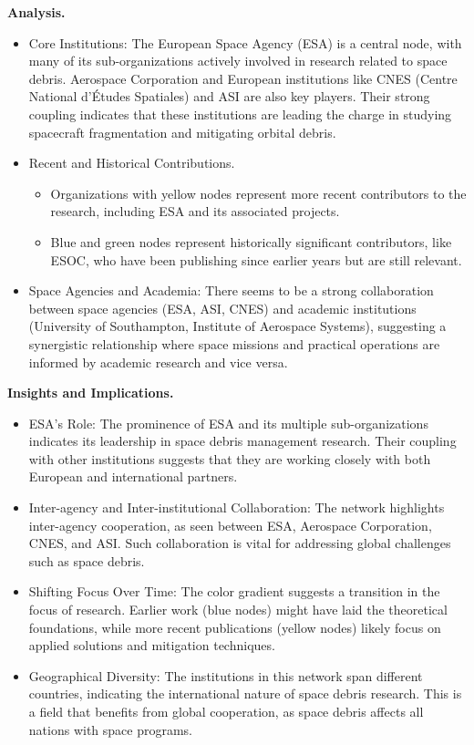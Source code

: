 \documentclass[journal ]{new-aiaa}
\begin{document}
\textbf{Analysis.}
\begin{itemize}
    \item Core Institutions: The European Space Agency (ESA) is a central node, with many of its sub-organizations actively involved in research related to space debris. Aerospace Corporation and European institutions like CNES (Centre National d'Études Spatiales) and ASI are also key players. Their strong coupling indicates that these institutions are leading the charge in studying spacecraft fragmentation and mitigating orbital debris.
    \item Recent and Historical Contributions.
    \begin{itemize}
        \item Organizations with yellow nodes represent more recent contributors to the research, including ESA and its associated projects.
        \item Blue and green nodes represent historically significant contributors, like ESOC, who have been publishing since earlier years but are still relevant.
    \end{itemize}
    \item Space Agencies and Academia: There seems to be a strong collaboration between space agencies (ESA, ASI, CNES) and academic institutions (University of Southampton, Institute of Aerospace Systems), suggesting a synergistic relationship where space missions and practical operations are informed by academic research and vice versa.
\end{itemize}

\textbf{Insights and Implications.}
\begin{itemize}
    \item ESA's Role: The prominence of ESA and its multiple sub-organizations indicates its leadership in space debris management research. Their coupling with other institutions suggests that they are working closely with both European and international partners.
    \item Inter-agency and Inter-institutional Collaboration: The network highlights inter-agency cooperation, as seen between ESA, Aerospace Corporation, CNES, and ASI. Such collaboration is vital for addressing global challenges such as space debris.
    \item Shifting Focus Over Time: The color gradient suggests a transition in the focus of research. Earlier work (blue nodes) might have laid the theoretical foundations, while more recent publications (yellow nodes) likely focus on applied solutions and mitigation techniques.
    \item Geographical Diversity: The institutions in this network span different countries, indicating the international nature of space debris research. This is a field that benefits from global cooperation, as space debris affects all nations with space programs.
\end{itemize}
\end{document}
